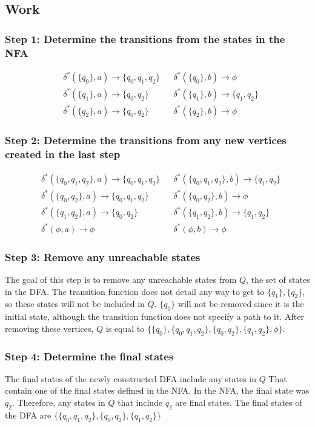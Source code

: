 \documentclass{assignment-x}
\begin{document}
\subsection{Work}

\subsubsection{Step 1: Determine the transitions from the states in the NFA}
\begin{align*}
&\delta^*(\{q_0\},a) \rightarrow \{q_0,q_1,q_2\} &&\delta^*(\{q_0\},b) \rightarrow \phi \\
&\delta^*(\{q_1\},a) \rightarrow \{q_0,q_2\} &&\delta^*(\{q_1\},b) \rightarrow \{q_1,q_2\} \\
&\delta^*(\{q_2\},a) \rightarrow \{q_0,q_2\} &&\delta^*(\{q_2\},b) \rightarrow \phi 
\end{align*}

\subsubsection{Step 2: Determine the transitions from any new vertices created in the last step}
\begin{align*}
&\delta^*(\{q_0,q_1,q_2\},a) \rightarrow \{q_0,q_1,q_2\} &&\delta^*(\{q_0,q_1,q_2\},b) \rightarrow \{q_1,q_2\} \\
&\delta^*(\{q_0,q_2\},a) \rightarrow \{q_0,q_1,q_2\} &&\delta^*(\{q_0,q_2\},b) \rightarrow \phi \\
&\delta^*(\{q_1,q_2\},a) \rightarrow \{q_0,q_2\} &&\delta^*(\{q_1,q_2\},b) \rightarrow \{q_1,q_2\} \\
&\delta^*(\phi,a) \rightarrow \phi &&\delta^*(\phi,b) \rightarrow \phi 
\end{align*}

\subsubsection{Step 3: Remove any unreachable states}
The goal of this step is to remove any unreachable states from $Q$, the set of states in the DFA. The transition function does not detail any way to get to $\{q_1\}, \{q_2\}$, so these states will not be included in $Q$. $\{q_0\}$ will not be removed since it is the initial state, although the transition function does not specify a path to it. After removing these vertices, $Q$ is equal to $\{\{q_0\},\{q_0,q_1,q_2\},\{q_0,q_2\},\{q_1,q_2\},\phi\}$.

\subsubsection {Step 4: Determine the final states}
The final states of the newly constructed DFA include any states in $Q$ That contain one of the final states defined in the NFA. In the NFA, the final state was $q_2$. Therefore, any states in $Q$ that include $q_2$ are final states. The final states of the DFA are $\{\{q_0,q_1,q_2\},\{q_0,q_2\},\{q_1,q_2\}\}$
\end{document}
